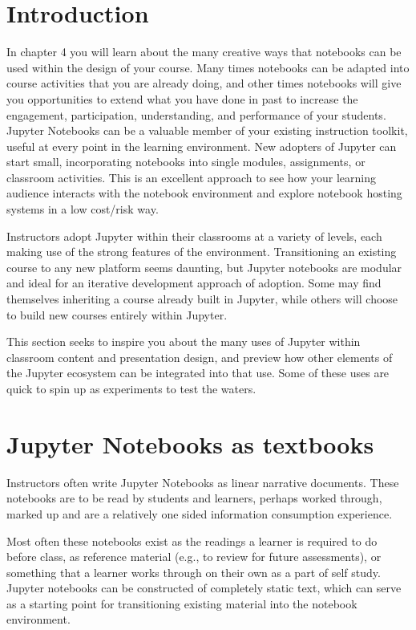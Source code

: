\documentclass[]{book}
\begin{document}
\section{Introduction}\label{introduction-1}

In chapter 4 you will learn about the many creative ways that notebooks
can be used within the design of your course. Many times notebooks can
be adapted into course activities that you are already doing, and other
times notebooks will give you opportunities to extend what you have done
in past to increase the engagement, participation, understanding, and
performance of your students. Jupyter Notebooks can be a valuable member
of your existing instruction toolkit, useful at every point in the
learning environment. New adopters of Jupyter can start small,
incorporating notebooks into single modules, assignments, or classroom
activities. This is an excellent approach to see how your learning
audience interacts with the notebook environment and explore notebook
hosting systems in a low cost/risk way.

Instructors adopt Jupyter within their classrooms at a variety of
levels, each making use of the strong features of the environment.
Transitioning an existing course to any new platform seems daunting, but
Jupyter notebooks are modular and ideal for an iterative development
approach of adoption. Some may find themselves inheriting a course
already built in Jupyter, while others will choose to build new courses
entirely within Jupyter.

This section seeks to inspire you about the many uses of Jupyter within
classroom content and presentation design, and preview how other
elements of the Jupyter ecosystem can be integrated into that use. Some
of these uses are quick to spin up as experiments to test the waters.

\section{Jupyter Notebooks as
textbooks}\label{jupyter-notebooks-as-textbooks}

Instructors often write Jupyter Notebooks as linear narrative documents.
These notebooks are to be read by students and learners, perhaps worked
through, marked up and are a relatively one sided information
consumption experience.

Most often these notebooks exist as the readings a learner is required
to do before class, as reference material (e.g., to review for future
assessments), or something that a learner works through on their own as
a part of self study. Jupyter notebooks can be constructed of completely
static text, which can serve as a starting point for transitioning
existing material into the notebook environment.
\end{document}
